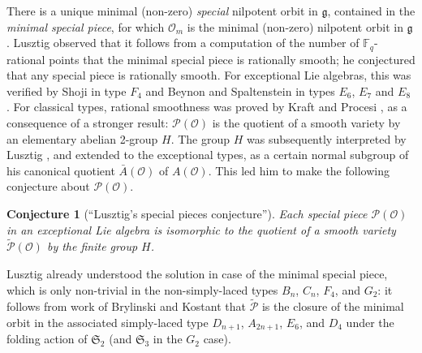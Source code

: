 \documentclass{amsart}
\newtheorem*{conj}{Conjecture}
\theoremstyle{definition}
\newcommand{\covP}{\widetilde{\mathcal{P}}}
\newcommand{\g}{\mathfrak{g}}
\newcommand{\Ab}{\bar{A}}
\newcommand{\0}{\mathcal{O}}
\begin{document}
There is a unique minimal (non-zero) {\it special} nilpotent orbit in $\g$, contained in the {\it minimal special piece}, for which $\0_m$ is the minimal (non-zero) nilpotent orbit in $\g$. 
Lusztig observed \cite{Lusztig:green} that it follows from a computation of the number of ${\mathbb F}_q$-rational points that the minimal special piece is rationally smooth; he conjectured that any special piece is rationally smooth.  For exceptional Lie algebras, this was verified by Shoji in type $F_4$ \cite{Shoji:Green} and Beynon and Spaltenstein in types $E_6$, $E_7$ and $E_8$ \cite{Beynon-Spaltenstein}. 
For classical types, rational smoothness was proved by Kraft and Procesi \cite{Kraft-Procesi:special}, as a consequence of a stronger result: ${\mathcal P}(\0)$ is the quotient of a smooth variety by an elementary abelian 2-group $H$. %
The group $H$
was subsequently interpreted by Lusztig \cite{Lusztig:unipotent}, 
and extended to the exceptional types, as a 
certain normal subgroup of his canonical quotient $\Ab(\0)$ of $A(\0)$.
This led him to make the following conjecture about ${\mathcal P}(\0)$.

\begin{conj}[``Lusztig's special pieces conjecture'']
Each special piece ${\mathcal P}(\0)$ 
in an exceptional Lie algebra is isomorphic to the quotient of a smooth variety 
$\covP(\0)$
by the finite group $H$.%
\end{conj}
Lusztig already understood the solution in case of the minimal special piece, which is only non-trivial in the non-simply-laced types $B_n$, $C_n$, $F_4$, and $G_2$: it follows from work of Brylinski and Kostant \cite{Brylinski-Kostant:JAMS} that 
$\covP$ is the closure of the minimal orbit in the associated simply-laced type $D_{n+1}$, $A_{2n+1}$, $E_6$, and $D_4$ under the folding action of $\mathfrak{S}_2$ (and $\mathfrak{S}_3$ in the $G_2$ case).

\end{document}
